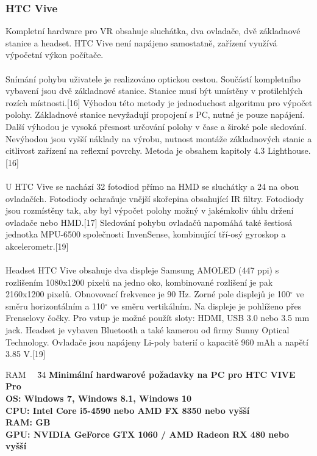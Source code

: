 \documentclass[a4paper, 12pt]{report}
\begin{document}
\subsubsection{HTC Vive} Kompletní hardware pro VR obsahuje sluchátka, dva ovladače, dvě základnové stanice a headset. HTC Vive není napájeno samostatně, zařízení využívá výpočetní výkon počítače. \\
\\
Snímání pohybu uživatele je realizováno optickou cestou. Součástí kompletního vybavení jsou dvě základnové stanice. Stanice musí být umístěny v protilehlých rozích místnosti.[16] Výhodou této metody je jednoduchost algoritmu pro výpočet polohy. Základnové stanice nevyžadují propojení s PC, nutné je pouze napájení. Další výhodou je vysoká přesnost určování polohy v čase a široké pole sledování. Nevýhodou jsou vyšší náklady na výrobu, nutnost montáže základnových stanic a citlivost zařízení na reflexní povrchy. Metoda je obsahem kapitoly 4.3 Lighthouse.[16]\\
\\
U HTC Vive se nachází 32 fotodiod přímo na HMD se sluchátky a 24 na obou ovladačích. Fotodiody ochraňuje vnější skořepina obsahující IR filtry. Fotodiody jsou rozmístěny tak, aby byl výpočet polohy možný v jakémkoliv úhlu držení ovladače nebo HMD.[17] Sledování pohybu ovladačů napomáhá také šestiosá jednotka MPU-6500 společnosti InvenSense, kombinující tří-osý gyroskop a akcelerometr.[19]\\
\\
Headset HTC Vive obsahuje dva displeje Samsung AMOLED (447 ppi) s rozlišením 1080x1200 pixelů na jedno oko, kombinované rozlišení je pak 2160x1200 pixelů. Obnovovací frekvence je 90 Hz. Zorné pole displejů je 100$^\circ$ ve směru horizontálním a 110$^\circ$ ve směru vertikálním. Na displeje je pohlíženo přes Frenselovy čočky. Pro vstup je možné použít sloty: HDMI, USB 3.0 nebo 3.5 mm jack. Headset je vybaven Bluetooth a také kamerou od firmy Sunny Optical Technology. Ovladače jsou napájeny Li-poly baterií o kapacitě 960 mAh a napětí 3.85 V.[19] 

\begin{tabbing}
    RAM ~~\= 
    \= 34 \kill
    \bfseries Minimální hardwarové požadavky na PC pro HTC VIVE Pro \> \\[1mm]
    OS: \> Windows 7, Windows 8.1, Windows 10\\
    CPU: \> Intel Core i5-4590 nebo AMD FX 8350 nebo vyšší\\
    RAM:  GB\\
    GPU: \> NVIDIA GeForce GTX 1060 / AMD Radeon RX 480 nebo vyšší\\
    \end{tabbing}
\end{document}
